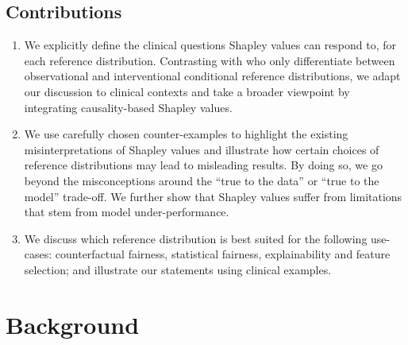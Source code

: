 \documentclass[nohyperref]{article}
\theoremstyle{plain}
\theoremstyle{definition}
\theoremstyle{remark}
\begin{document}
\subsection{Contributions}
\begin{enumerate}[itemsep=0.5mm]
    \item We explicitly define the clinical questions Shapley values can respond to, for each reference distribution. Contrasting with \cite{chen2020true} who only differentiate between observational and interventional conditional reference distributions, we adapt our discussion to clinical contexts and take a broader viewpoint by integrating causality-based Shapley values.
    \item We use carefully chosen counter-examples to highlight the existing misinterpretations of Shapley values and illustrate how certain choices of reference distributions may lead to misleading results. By doing so, we go beyond the misconceptions around the ``true to the data'' or ``true to the model'' trade-off. We further show that Shapley values suffer from limitations that stem from model under-performance.
    \item We discuss which reference distribution is best suited for the following use-cases: counterfactual fairness, statistical fairness, explainability and feature selection; and illustrate our statements using clinical examples.
\end{enumerate}



\section{Background} 
\label{sec:shapley_values}
\end{document}
